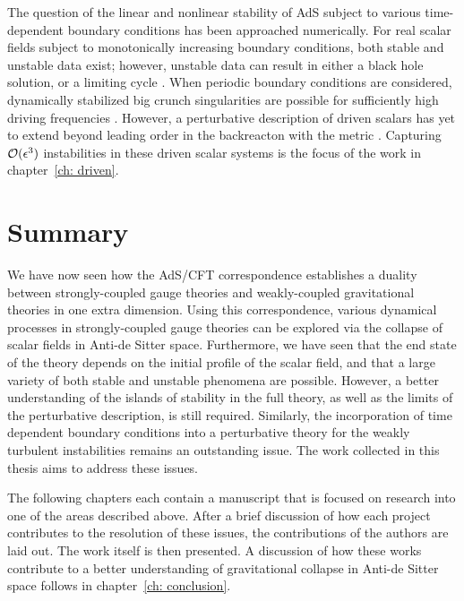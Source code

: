 \documentclass[../PhD.tex]{subfiles}
\begin{document}
The question of the linear and nonlinear stability of AdS subject to various time-dependent boundary conditions has been approached numerically. For real scalar fields subject to monotonically increasing boundary conditions, both stable and unstable data exist; however, unstable data can result in either a black hole solution, or a limiting cycle \cite{1612.07701}. When periodic boundary conditions are considered, dynamically stabilized big crunch singularities are possible for sufficiently high driving frequencies \cite{1206.2902}. However, a perturbative description of driven scalars has yet to extend beyond leading order in the backreacton with the metric \cite{1308.2132}. Capturing $\mathcal O(\epsilon^3)$ instabilities in these driven scalar systems is the focus of the work in chapter~\ref{ch: driven}. 



\section{Summary}
\label{sec: summary}

We have now seen how the AdS/CFT correspondence establishes a duality between strongly-coupled gauge theories and weakly-coupled gravitational theories in one extra dimension. Using this correspondence, various dynamical processes in strongly-coupled gauge theories can be explored via the collapse of scalar fields in Anti-de Sitter space. Furthermore, we have seen that the end state of the theory depends on the initial profile of the scalar field, and that a large variety of both stable and unstable phenomena are possible. However, a better understanding of the islands of stability in the full theory, as well as the limits of the perturbative description, is still required. Similarly, the incorporation of time dependent boundary conditions into a perturbative theory for the weakly turbulent instabilities remains an outstanding issue. The work collected in this thesis aims to address these issues.

The following chapters each contain a manuscript that is focused on research into one of the areas described above. After a brief discussion of how each project contributes to the resolution of these issues, the contributions of the authors are laid out. The work itself is then presented. A discussion of how these works contribute to a better understanding of gravitational collapse in Anti-de Sitter space follows in chapter~\ref{ch: conclusion}.

\end{document}
